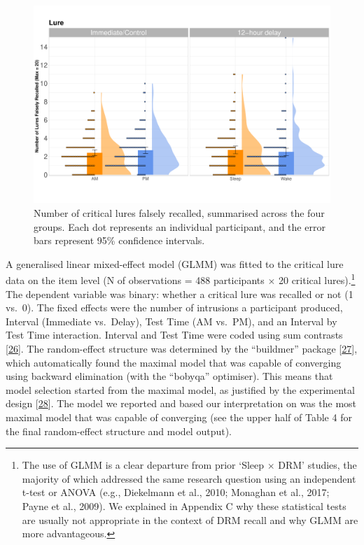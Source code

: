 \documentclass[
]{article}
\begin{document}
\begin{figure}

{\centering \includegraphics{Figures/luregraph} 

}

\caption{Number of critical lures falsely recalled, summarised across the four groups. Each dot represents an individual participant, and the error bars represent 95\% confidence intervals.}\label{fig:lurefig}
\end{figure}

A generalised linear mixed-effect model (GLMM) was fitted to the critical lure data on the item level (N of observations = 488 participants \(\times\) 20 critical lures).\footnote{The use of GLMM is a clear departure from prior ‘Sleep $\times$ DRM’ studies, the majority of which addressed the same research question using an independent t-test or ANOVA (e.g., Diekelmann et al., 2010; Monaghan et al., 2017; Payne et al., 2009). We explained in Appendix C why these statistical tests are usually not appropriate in the context of DRM recall and why GLMM are more advantageous.} The dependent variable was binary: whether a critical lure was recalled or not (1 vs.~0). The fixed effects were the number of intrusions a participant produced, Interval (Immediate vs.~Delay), Test Time (AM vs.~PM), and an Interval by Test Time interaction. Interval and Test Time were coded using sum contrasts {[}\protect\hyperlink{ref-barr2019a}{26}{]}. The random-effect structure was determined by the ``buildmer'' package {[}\protect\hyperlink{ref-voeten2021a}{27}{]}, which automatically found the maximal model that was capable of converging using backward elimination (with the ``bobyqa'' optimiser). This means that model selection started from the maximal model, as justified by the experimental design {[}\protect\hyperlink{ref-barr2013a}{28}{]}. The model we reported and based our interpretation on was the most maximal model that was capable of converging (see the upper half of Table 4 for the final random-effect structure and model output).
\end{document}
